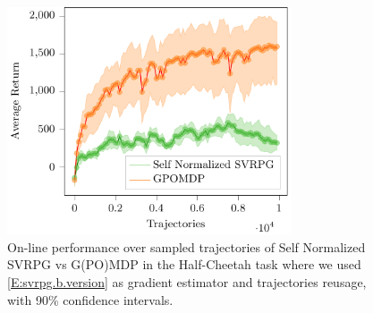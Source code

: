 \begin{figure}[h]
	\begin{minipage}[h]{1\textwidth}
		\centering
		\includegraphics[width=0.75\textwidth]{Images/Experiments/half_cheetah_GPOMDP_vs_SN_SVRPG_B_reuse.pdf}
		\vspace{-0.1in}
		\caption{On-line performance over sampled trajectories of Self Normalized \acs{SVRPG} vs G(PO)MDP in the Half-Cheetah task where we used \ref{E:svrpg.b.version} as gradient estimator and trajectories reusage, with 90\% confidence intervals.}
		\label{fig:hcten}
	\end{minipage}
	\vspace{-0.15in}
\end{figure}



